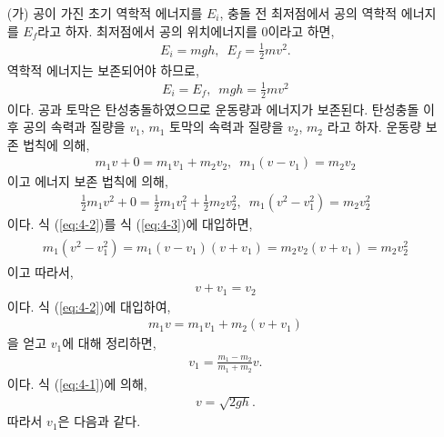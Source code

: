 \documentclass[floatfix,nofootinbib,superscriptaddress,fleqn]{revtex4-2}
\begin{document}


\vspace{1cm}


\begin{itemize}
  \item[(가)] 공이 가진 초기 역학적 에너지를 $E_i$, 충돌 전 최저점에서 
공의 역학적 에너지를 $E_f$라고 하자. 최저점에서 공의 위치에너지를 0이라고 하면,
\begin{align}
  E_i = mgh,\,\,\, E_f=\frac{1}{2}mv^2.
\end{align}
역학적 에너지는 보존되어야 하므로,
\begin{align}\label{eq:4-1}
  E_i = E_f,\,\,\, mgh=\frac{1}{2}mv^2
\end{align}
이다. 공과 토막은 탄성충돌하였으므로 운동량과 에너지가 보존된다. 
탄성충돌 이후 공의 속력과 질량을 $v_1$, $m_1$ 토막의 속력과 질량을 $v_2$, $m_2$ 라고 
하자. 운동량 보존 법칙에 의해,
\begin{align}\label{eq:4-2}
  m_1v+0 = m_1v_1+m_2v_2,\,\,\,m_1(v-v_1)=m_2v_2
\end{align}
이고 에너지 보존 법칙에 의해,
\begin{align}\label{eq:4-3}
  \frac{1}{2}m_1v^2+0 = \frac{1}{2}m_1v_1^2+\frac{1}{2}m_2v_2^2
  ,\,\,\,  m_1(v^2-v_1^2) =m_2v_2^2
\end{align}
이다. 식 (\ref{eq:4-2})를 식 (\ref{eq:4-3})에 대입하면,
\begin{align}
  \begin{split}
    m_1(v^2-v^2_1)=m_1(v-v_1)(v+v_1)=m_2v_2(v+v_1)=m_2v_2^2
  \end{split}
\end{align}
이고 따라서,
\begin{align}\label{eq:4-4}
  v+v_1 = v_2
\end{align}
이다. 식 (\ref{eq:4-2})에 대입하여,
\begin{align}
  m_1v = m_1v_1+m_2(v+v_1)
\end{align}
을 얻고 $v_1$에 대해 정리하면,
\begin{align}
  v_1 = \frac{m_1-m_2}{m_1+m_2}v.
\end{align}
이다. 식 (\ref{eq:4-1})에 의해,
\begin{align}
  v = \sqrt{2gh}.
\end{align}
따라서 $v_1$은 다음과 같다.
\begin{align}
  \begin{split}

\end{split}
\end{align}
\end{itemize}
\end{document}
